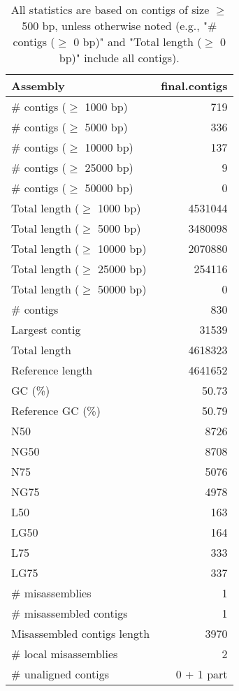 \documentclass[12pt,a4paper]{article}
\begin{document}
\begin{table}[ht]
\begin{center}
\caption{All statistics are based on contigs of size $\geq$ 500 bp, unless otherwise noted (e.g., "\# contigs ($\geq$ 0 bp)" and "Total length ($\geq$ 0 bp)" include all contigs).}
\begin{tabular}{|l*{1}{|r}|}
\hline
Assembly & final.contigs \\ \hline
\# contigs ($\geq$ 1000 bp) & 719 \\ \hline
\# contigs ($\geq$ 5000 bp) & 336 \\ \hline
\# contigs ($\geq$ 10000 bp) & 137 \\ \hline
\# contigs ($\geq$ 25000 bp) & 9 \\ \hline
\# contigs ($\geq$ 50000 bp) & 0 \\ \hline
Total length ($\geq$ 1000 bp) & 4531044 \\ \hline
Total length ($\geq$ 5000 bp) & 3480098 \\ \hline
Total length ($\geq$ 10000 bp) & 2070880 \\ \hline
Total length ($\geq$ 25000 bp) & 254116 \\ \hline
Total length ($\geq$ 50000 bp) & 0 \\ \hline
\# contigs & 830 \\ \hline
Largest contig & 31539 \\ \hline
Total length & 4618323 \\ \hline
Reference length & 4641652 \\ \hline
GC (\%) & 50.73 \\ \hline
Reference GC (\%) & 50.79 \\ \hline
N50 & 8726 \\ \hline
NG50 & 8708 \\ \hline
N75 & 5076 \\ \hline
NG75 & 4978 \\ \hline
L50 & 163 \\ \hline
LG50 & 164 \\ \hline
L75 & 333 \\ \hline
LG75 & 337 \\ \hline
\# misassemblies & 1 \\ \hline
\# misassembled contigs & 1 \\ \hline
Misassembled contigs length & 3970 \\ \hline
\# local misassemblies & 2 \\ \hline
\# unaligned contigs & 0 + 1 part \\ \hline

\end{tabular}
\end{center}
\end{table}
\end{document}
